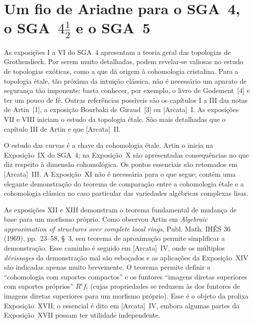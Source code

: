 
\chapter*{Um fio de Ariadne para o SGA~4, o SGA~$4\frac{1}{2}$ e o SGA~5}

As exposições I a VI do SGA~4 apresentam a teoria geral das topologias de
Grothendieck. Por serem muito detalhadas, podem revelar-se valiosas no estudo
de topologias exóticas, como a que dá origem à cohomologia cristalina. Para a
topologia étale, tão próxima da intuição clássica, não é necessário um aparato
de segurança tão imponente: basta conhecer, por exemplo, o livro de
Godement~[4] e ter um pouco de fé. Outras referências possíveis são os
capítulos I a III das notas de Artin~[1], a exposição Bourbaki de Giraud~[3]
ou [Arcata]~I. As exposições VII e VIII iniciam o estudo da topologia étale.
São mais detalhadas que o capítulo III de Artin e que [Arcata]~II.

O estudo das curvas é a chave da cohomologia étale. Artin o inicia na
Exposição~IX do SGA~4; na Exposição~X são apresentadas consequências no que
diz respeito à dimensão cohomológica. Os pontos essenciais são retomados em
[Arcata]~III. A Exposição~XI não é necessária para o que segue; contém uma
elegante demonstração do teorema de comparação entre a cohomologia étale e a
cohomologia clássica no caso particular das variedades algébricas complexas
lisas.

As exposições XII e XIII demonstram o teorema fundamental de mudança de base
para um morfismo próprio. Como observou Artin em
\emph{Algebraic approximation of structures over complete local rings},
Publ. Math. IHÉS 36 (1969), pp.~23--58, \S~3, seu teorema de aproximação
permite simplificar a demonstração. Esse caminho é seguido em [Arcata]~IV,
onde os múltiplos \emph{dévissages} da demonstração mal são esboçados e as
aplicações da Exposição~XIV são indicadas apenas muito brevemente. O teorema
permite definir a ``cohomologia com suportes compactos'' e os funtores
``imagens diretas superiores com suportes próprios'' $R^i f_!$ (cujas
propriedades se reduzem às dos funtores de imagens diretas superiores para um
morfismo próprio). Esse é o objeto da prolixa Exposição~XVII; o essencial é
dito em [Arcata]~IV, embora algumas partes da Exposição~XVII possam ter
utilidade independente.

